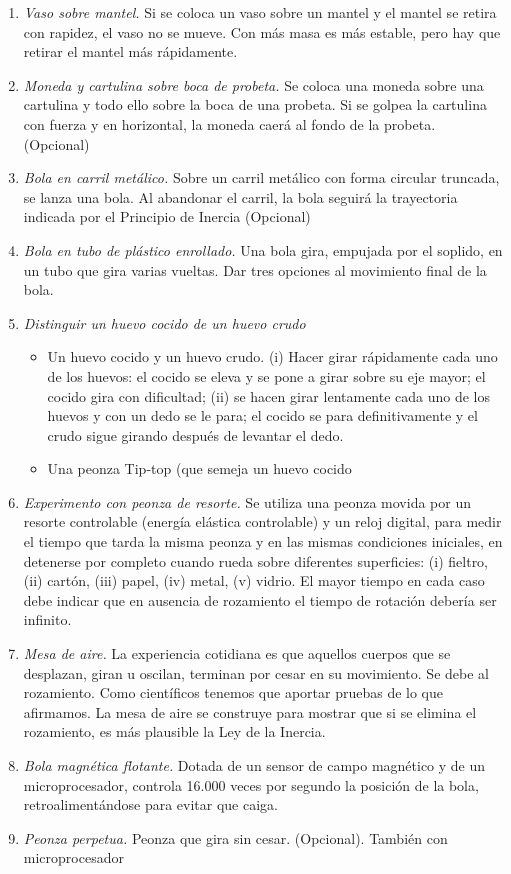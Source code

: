 \documentclass[11pt]{articulo}
\begin{document}
\begin{enumerate}
\item {\it Vaso sobre mantel.} Si se coloca un vaso sobre un mantel y el mantel se retira con rapidez, el vaso no se mueve.  Con m\'as masa es m\'as estable, pero hay que retirar el mantel m\'as r\'apidamente.
\item {\it Moneda y cartulina sobre boca de probeta.} Se coloca una moneda sobre una cartulina y todo ello sobre la boca de una probeta. Si se golpea la cartulina con fuerza y en horizontal, la moneda caer\'a al fondo de la probeta. (Opcional)
\item {\it Bola en carril met\'alico.} Sobre un carril met\'alico con forma circular truncada, se lanza una bola. Al abandonar el carril, la bola seguir\'a la trayectoria indicada por el Principio de Inercia (Opcional)
\item {\it Bola en tubo de pl\'astico enrollado.} Una bola gira, empujada por el soplido, en un tubo que gira varias vueltas.  Dar tres opciones al movimiento final de la bola.
\item {\it Distinguir un huevo cocido de un huevo crudo}
  \begin{itemize}
  \item Un huevo cocido y un huevo crudo. (i) Hacer girar r\'apidamente cada uno de los huevos: el cocido se eleva y se pone a girar sobre su eje mayor; el cocido gira con dificultad; (ii) se hacen girar lentamente cada uno de los huevos y con un dedo se le para; el cocido se para definitivamente y el crudo sigue girando despu\'es de levantar el dedo. 
  \item Una peonza Tip-top (que semeja un huevo cocido
  \end{itemize}
\item {\it Experimento con peonza de resorte.} Se utiliza una peonza movida por un resorte controlable (energ\'ia el\'astica controlable) y un reloj digital, para medir el tiempo que tarda la misma peonza y en las mismas condiciones iniciales, en detenerse por completo cuando rueda sobre diferentes superficies: (i) fieltro, (ii) cart\'on, (iii) papel, (iv) metal, (v) vidrio. El mayor tiempo en cada caso debe indicar que en ausencia de rozamiento el tiempo de rotaci\'on deber\'ia ser infinito.
\item {\it Mesa de aire.} La experiencia cotidiana es que aquellos cuerpos que se desplazan, giran u oscilan, terminan por cesar en su movimiento. Se debe al rozamiento. Como cient\'ificos tenemos que aportar pruebas de lo que afirmamos. La mesa de aire se construye para mostrar que si se elimina el rozamiento, es m\'as plausible la Ley de la Inercia. 
\item {\it Bola magn\'etica flotante.} Dotada de un sensor de campo magn\'etico y de un microprocesador, controla 16.000 veces por segundo la posici\'on de la bola, retroaliment\'andose para evitar que caiga.
\item {\it Peonza perpetua.} Peonza que gira sin cesar. (Opcional). Tambi\'en con microprocesador
\end{enumerate}
\end{document}
